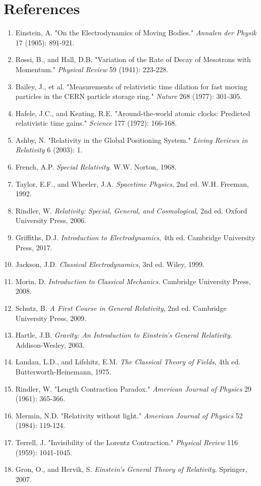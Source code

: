 \documentclass[a4paper, 11pt]{article}
\begin{document}
\section*{References}

\begin{enumerate}
\item Einstein, A. "On the Electrodynamics of Moving Bodies." \textit{Annalen der Physik} 17 (1905): 891-921.
\item Rossi, B., and Hall, D.B. "Variation of the Rate of Decay of Mesotrons with Momentum." \textit{Physical Review} 59 (1941): 223-228.
\item Bailey, J., et al. "Measurements of relativistic time dilation for fast moving particles in the CERN particle storage ring." \textit{Nature} 268 (1977): 301-305.
\item Hafele, J.C., and Keating, R.E. "Around-the-world atomic clocks: Predicted relativistic time gains." \textit{Science} 177 (1972): 166-168.
\item Ashby, N. "Relativity in the Global Positioning System." \textit{Living Reviews in Relativity} 6 (2003): 1.
\item French, A.P. \textit{Special Relativity}. W.W. Norton, 1968.
\item Taylor, E.F., and Wheeler, J.A. \textit{Spacetime Physics}, 2nd ed. W.H. Freeman, 1992.
\item Rindler, W. \textit{Relativity: Special, General, and Cosmological}, 2nd ed. Oxford University Press, 2006.
\item Griffiths, D.J. \textit{Introduction to Electrodynamics}, 4th ed. Cambridge University Press, 2017.
\item Jackson, J.D. \textit{Classical Electrodynamics}, 3rd ed. Wiley, 1999.
\item Morin, D. \textit{Introduction to Classical Mechanics}. Cambridge University Press, 2008.
\item Schutz, B. \textit{A First Course in General Relativity}, 2nd ed. Cambridge University Press, 2009.
\item Hartle, J.B. \textit{Gravity: An Introduction to Einstein's General Relativity}. Addison-Wesley, 2003.
\item Landau, L.D., and Lifshitz, E.M. \textit{The Classical Theory of Fields}, 4th ed. Butterworth-Heinemann, 1975.
\item Rindler, W. "Length Contraction Paradox." \textit{American Journal of Physics} 29 (1961): 365-366.
\item Mermin, N.D. "Relativity without light." \textit{American Journal of Physics} 52 (1984): 119-124.
\item Terrell, J. "Invisibility of the Lorentz Contraction." \textit{Physical Review} 116 (1959): 1041-1045.
\item Gron, O., and Hervik, S. \textit{Einstein's General Theory of Relativity}. Springer, 2007.
\end{enumerate}
\end{document}
